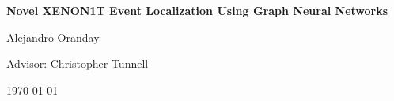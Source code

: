 \begin{titlepage}
	\begin{center}
	\vspace*{4cm}

	\Huge
	\textbf{Novel XENON1T Event Localization Using Graph Neural Networks}

	\vspace{3cm}
	\LARGE
	Alejandro Oranday

	\vspace{2cm}
	\normalsize Advisor: Christopher Tunnell

	\vfill
	\today
	\end{center}
\end{titlepage}

